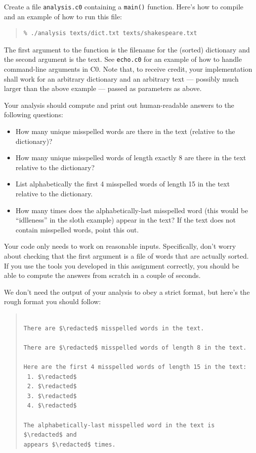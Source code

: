 \documentclass[12pt]{exam}
\begin{document}
\begin{task}[3]
Create a file \lstinline'analysis.c0' containing a
\lstinline'main()' function.  Here's how to compile and an example
of how to run this file:
\begin{quote}
\begin{lstlisting}[language={[coin]C}, basicstyle=\smallbasicstyle]
% cc0 -w -o analysis lib/*.c0 speller.c0 analysis.c0
% ./analysis texts/dict.txt texts/shakespeare.txt
\end{lstlisting}
\end{quote}
The first argument to the function is the filename for the (sorted)
dictionary and the second argument is the text.  See
\lstinline'echo.c0' for an example of how to handle command-line
arguments in C0.  Note that, to receive credit, your implementation
shall work for an arbitrary dictionary and an arbitrary text ---
possibly much larger than the above example --- passed as parameters
as above.

Your analysis should compute and print out human-readable answers to
the following questions:

\begin{itemize}
\itemsep=0pt
\item%
  How many unique misspelled words are there in the text (relative to the
  dictionary)?
\item%
  How many unique misspelled words of length exactly 8 are there in the text
  relative to the dictionary?
\item%
  List alphabetically the first 4 misspelled words of length 15 in the
  text relative to the dictionary.
\item%
  How many times does the alphabetically-last misspelled word (this
  would be ``idlleness'' in the sloth example) appear
  in the text?  If the text does not contain misspelled words, point
  this out.
\end{itemize}
Your code only needs to work on reasonable inputs. Specifically, don't
worry about checking that the first argument is a file of words that
are actually sorted. If you use the tools you developed in this
assignment correctly, you should be able to compute the answers from
scratch in a couple of seconds.
\end{task}
\enlargethispage{5ex}
We don't need the output of your analysis to obey a strict format, but
here's the rough format you should follow:
\begin{quote}
\begin{lstlisting}[language={[coin]C}, mathescape, aboveskip=0pt, basicstyle=\smallbasicstyle]

There are $\redacted$ misspelled words in the text.

There are $\redacted$ misspelled words of length 8 in the text.

Here are the first 4 misspelled words of length 15 in the text:
 1. $\redacted$
 2. $\redacted$
 3. $\redacted$
 4. $\redacted$

The alphabetically-last misspelled word in the text is $\redacted$ and
appears $\redacted$ times.
\end{lstlisting}
\end{quote}
\end{document}

